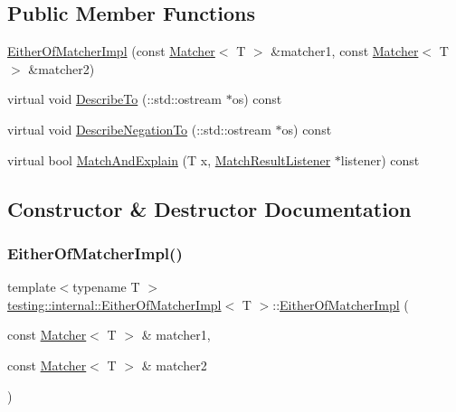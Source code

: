 \subsection*{Public Member Functions}
\begin{DoxyCompactItemize}
\item 
\hyperlink{classtesting_1_1internal_1_1_either_of_matcher_impl_af7008f5d8f2950fbe75e6ff9b78af584}{Either\+Of\+Matcher\+Impl} (const \hyperlink{classtesting_1_1_matcher}{Matcher}$<$ T $>$ \&matcher1, const \hyperlink{classtesting_1_1_matcher}{Matcher}$<$ T $>$ \&matcher2)
\item 
virtual void \hyperlink{classtesting_1_1internal_1_1_either_of_matcher_impl_a0389690d0ce06a1ca447db6281a380d3}{Describe\+To} (\+::std\+::ostream $\ast$os) const
\item 
virtual void \hyperlink{classtesting_1_1internal_1_1_either_of_matcher_impl_ab5a4eac981acde377a4fd344507b1d71}{Describe\+Negation\+To} (\+::std\+::ostream $\ast$os) const
\item 
virtual bool \hyperlink{classtesting_1_1internal_1_1_either_of_matcher_impl_af00ed8cd85c36f1e862bf85f776cee3b}{Match\+And\+Explain} (T x, \hyperlink{classtesting_1_1_match_result_listener}{Match\+Result\+Listener} $\ast$listener) const
\end{DoxyCompactItemize}


\subsection{Constructor \& Destructor Documentation}
\mbox{\label{classtesting_1_1internal_1_1_either_of_matcher_impl_af7008f5d8f2950fbe75e6ff9b78af584}} 
\subsubsection{\texorpdfstring{Either\+Of\+Matcher\+Impl()}{EitherOfMatcherImpl()}}
{\footnotesize\ttfamily template$<$typename T $>$ \\
\hyperlink{classtesting_1_1internal_1_1_either_of_matcher_impl}{testing\+::internal\+::\+Either\+Of\+Matcher\+Impl}$<$ T $>$\+::\hyperlink{classtesting_1_1internal_1_1_either_of_matcher_impl}{Either\+Of\+Matcher\+Impl} (\begin{DoxyParamCaption}\item[{const \hyperlink{classtesting_1_1_matcher}{Matcher}$<$ T $>$ \&}]{matcher1,  }\item[{const \hyperlink{classtesting_1_1_matcher}{Matcher}$<$ T $>$ \&}]{matcher2 }\end{DoxyParamCaption})\hspace{0.3cm}{\ttfamily [inline]}}



